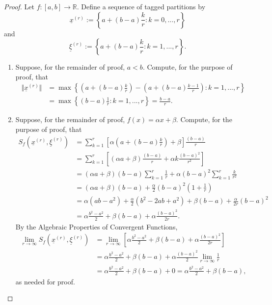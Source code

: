\documentclass[12pt]{article}
\theoremstyle{definition}
\begin{document}
\begin{proof}
    Let \(f : [a, b] \to \mathbb{R}\). Define a sequence of tagged partitions by
    \[
        \underline{x}^{(r)} := \left\{a + (b - a)\frac{k}{r} : k = 0,...,r\right\}
    \]
    and 
    \[
        \underline{\xi}^{(r)} := \left\{a + (b - a)\frac{k}{r} : k = 1,...,r\right\}.
    \]
    \begin{enumerate}[label=(\alph*)]
        \item Suppose, for the remainder of proof, \(a < b\). Compute, for the purpose of proof, that
        \begin{align*}
            \Vert \underline{x}^{(r)} \Vert &= \max\left\{\left(a + (b - a)\frac{k}{r}\right) - \left(a + (b - a)\frac{k - 1}{r}\right)  : k = 1,...,r\right\} \\
            &= \max\left\{(b - a)\frac{1}{r} : k = 1,...,r\right\} = \frac{b - a}{r}.
        \end{align*}
        \item Suppose, for the remainder of proof, \(f(x) = \alpha x + \beta\). Compute, for the purpose of proof, that
        \begin{align*}
            S_f\left(\underline{x}^{(r)}, \underline{\xi}^{(r)}\right) &= \sum_{k = 1}^{r}\left[\alpha\left(a + (b - a)\frac{k}{r}\right) + \beta\right]\frac{(b - a)}{r} \\
            &= \sum_{k = 1}^r\left[(\alpha a + \beta)\frac{(b - a)}{r} + \alpha k \frac{(b - a)^2}{r^2} \right] \\
            &= (\alpha a + \beta)(b - a) \sum_{k = 1}^r\frac{1}{r} + \alpha(b - a)^2 \sum_{k = 1}^{r}\frac{k}{r^2} \\
            &= (\alpha a + \beta)(b - a) + \frac{\alpha}{2}(b - a)^2\left(1 + \frac{1}{r}\right) \\
            &= \alpha(ab - a^2) + \frac{\alpha}{2}(b^2 - 2ab + a^2) + \beta(b - a) + \frac{\alpha}{2r}(b - a)^2 \\
            &= \alpha\frac{b^2 - a^2}{2} + \beta(b - a) + \alpha \frac{(b - a)^2}{2r}.
        \end{align*}
        By the Algebraic Properties of Convergent Functions,
        \begin{align*}
            \lim_{r \to \infty}S_f\left(\underline{x}^{(r)}, \underline{\xi}^{(r)}\right) &= \lim_{r \to \infty}\left[\alpha\frac{b^2 - a^2}{2} + \beta(b - a) + \alpha\frac{(b - a)^2}{2r}\right] \\
            &= \alpha\frac{b^2 - a^2}{2} + \beta(b - a) + \alpha\frac{(b - a)^2}{2}\lim_{r \to \infty}\frac{1}{r} \\
            &= \alpha\frac{b^2 - a^2}{2} + \beta(b - a) + 0 = \alpha\frac{b^2 - a^2}{2} + \beta(b - a),
        \end{align*}
        as needed for proof.
    \end{enumerate}
\end{proof}
\end{document}
